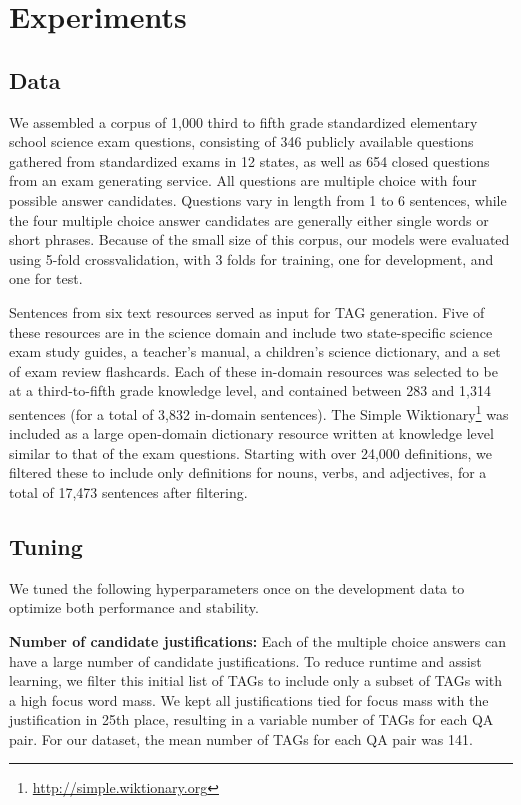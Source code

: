 \section{Experiments}
\label{sec-cl2017:experiments}

\subsection{Data}
\label{sec-cl2017:data}


{} We assembled a corpus of 1,000 third to fifth grade standardized elementary school science exam questions, consisting of 346 publicly available questions gathered from standardized exams in 12 states, as well as 654 closed questions from an exam generating service. 
All questions are multiple choice with four possible answer candidates. Questions vary in length from 1 to 6 sentences, while the four multiple choice answer candidates are generally either single words or short phrases. 
Because of the small size of this corpus, our models were evaluated using 5-fold crossvalidation, with 3 folds for training, one for development, and one for test. 

{} Sentences from six text resources served as input for TAG generation.  Five of these resources are in the science domain and include two state-specific science exam study guides, a teacher's manual, a children's science dictionary, and a set of exam review flashcards.  Each of these in-domain resources was selected to be at a third-to-fifth grade knowledge level, and contained between 283 and 1,314 sentences (for a total of 3,832 in-domain sentences).  
The Simple Wiktionary\footnote{\url{http://simple.wiktionary.org}} was included as a large open-domain dictionary resource written at knowledge level similar to that of the exam questions.  Starting with over 24,000 definitions, we filtered these to include only definitions for nouns, verbs, and adjectives, for a total of 17,473 sentences after filtering.

\subsection{Tuning}
\label{sec-cl2017:tuning}
We tuned the following hyperparameters once on the development data to optimize both performance and stability.

{\flushleft \textbf{Number of candidate justifications:}} 
Each of the multiple choice answers can have a large number of candidate justifications.  To reduce runtime and assist learning, we filter this initial list of TAGs to include only a subset of TAGs with a high focus word mass. We kept all justifications tied for focus mass with the justification in 25th place, resulting in a variable number of TAGs for each QA pair.  For our dataset, the mean number of TAGs for each QA pair was 141. \\

